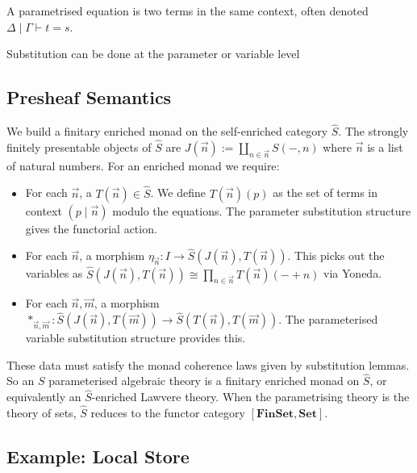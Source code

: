 \documentclass{scrartcl}
\theoremstyle{definition}
\newcommand{\Set}{\mathbf{Set}}
\newcommand{\Fin}{\mathbf{FinSet}}
\begin{document}
A parametrised equation is two terms in the same context, often denoted $\Delta\mid\Gamma\vdash t = s$.

Substitution can be done at the parameter or variable level
\begin{prooftree}
\end{prooftree}
\begin{prooftree}
\end{prooftree}

\subsection{Presheaf Semantics}

We build a finitary enriched monad on the self-enriched category $\hat{S}$. The strongly finitely presentable objects of $\hat{S}$ are $J(\vec{n}) := \coprod_{n\in\vec{n}}S({-},n)$ where $\vec{n}$ is a list of natural numbers. For an enriched monad we require:
\begin{itemize}
    \item For each $\vec{n}$, a $T(\vec{n})\in \hat{S}$. We define $T(\vec{n})(p)$ as the set of terms in context $(p\mid\vec{n})$ modulo the equations. The parameter substitution structure gives the functorial action.
    \item For each $\vec{n}$, a morphism $\eta_{\vec{n}} : I\to\hat{S}(J(\vec{n}), T(\vec{n}))$. This picks out the variables as $\hat{S}(J(\vec{n}), T(\vec{n})) \cong \prod_{n\in\vec{n}}T(\vec{n})({-}+n)$ via Yoneda.
    \item For each $\vec{n},\vec{m}$, a morphism $*_{\vec{n},\vec{m}}:\hat{S}(J(\vec{n}), T(\vec{m}))\to \hat{S}(T(\vec{n}), T(\vec{m}))$. The parameterised variable substitution structure provides this. 
\end{itemize}
These data must satisfy the monad coherence laws given by substitution lemmas. So an $S$ parameterised algebraic theory is a finitary enriched monad on $\hat{S}$, or equivalently an $\hat{S}$-enriched Lawvere theory. When the parametrising theory is the theory of sets, $\hat{S}$ reduces to the functor category $[\Fin,\Set]$.

\subsection{Example: Local Store}
\end{document}
